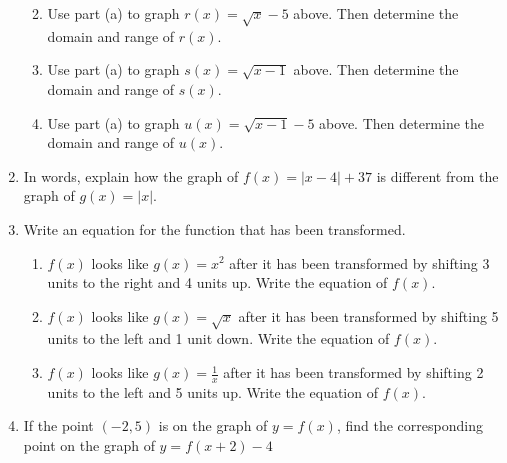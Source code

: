 \begin{enumerate}
\begin{enumerate}
\begin{tikzpicture}[y=.5cm, x=0.5cm,font=\sffamily]
  \end{tikzpicture}

\item Use part (a) to graph $r(x)=\sqrt{x}-5$ above.  Then determine the domain and range of $r(x)$.
\vfill
\item Use part (a) to graph $s(x)=\sqrt{x-1}$ above.  Then determine the domain and range of $s(x)$.
\vfill
\item Use part (a) to graph $u(x)=\sqrt{x-1}-5$ above.  Then determine the domain and range of $u(x)$.
\vfill
\end{enumerate}


\newpage

\item In words, explain how the graph of $f(x)=|x-4|+37$ is different from the graph of $g(x)=|x|$.
\vfill

\item Write an equation for the function that has been transformed.
\begin{enumerate}
\item $f(x)$ looks like $g(x)=x^2$ after it has been transformed by shifting 3 units to the right and 4 units up.  Write the equation of $f(x)$.
\vfill
\item $f(x)$ looks like $g(x)=\sqrt{x}$ after it has been transformed by shifting 5 units to the left and 1 unit down.  Write the equation of $f(x)$.
\vfill
\item $f(x)$ looks like $\displaystyle g(x)=\frac{1}{x}$ after it has been transformed by shifting 2 units to the left and 5 units up.  Write the equation of $f(x)$.
\vfill
\end{enumerate}

\item If the point $(-2,5)$ is on the graph of $y=f(x)$, find the corresponding point on the graph of $y=f(x+2)-4$
\vfill


\end{enumerate}

